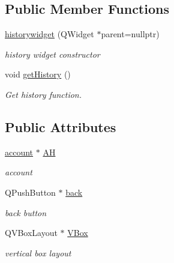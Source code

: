 \subsection*{Public Member Functions}
\begin{DoxyCompactItemize}
\item 
\hyperlink{classhistorywidget_ac21cb2c9cdecd91ac572d8fc8ba50708}{historywidget} (Q\+Widget $\ast$parent=nullptr)
\begin{DoxyCompactList}\small\item\em history widget constructor \end{DoxyCompactList}\item 
void \hyperlink{classhistorywidget_aa2edafd200341f9273bc3c8c4930902e}{get\+History} ()
\begin{DoxyCompactList}\small\item\em Get history function. \end{DoxyCompactList}\end{DoxyCompactItemize}
\subsection*{Public Attributes}
\begin{DoxyCompactItemize}
\item 
\mbox{\label{classhistorywidget_a9d630c4651725438d7161588bd084248}} 
\hyperlink{classaccount}{account} $\ast$ \hyperlink{classhistorywidget_a9d630c4651725438d7161588bd084248}{AH}
\begin{DoxyCompactList}\small\item\em account \end{DoxyCompactList}\item 
\mbox{\label{classhistorywidget_aa03cf30ef4ba1cf78f4e903d981d9783}} 
Q\+Push\+Button $\ast$ \hyperlink{classhistorywidget_aa03cf30ef4ba1cf78f4e903d981d9783}{back}
\begin{DoxyCompactList}\small\item\em back button \end{DoxyCompactList}\item 
\mbox{\label{classhistorywidget_a2f81897b41709e0218730acb285e60ea}} 
Q\+V\+Box\+Layout $\ast$ \hyperlink{classhistorywidget_a2f81897b41709e0218730acb285e60ea}{V\+Box}
\begin{DoxyCompactList}\small\item\em vertical box layout \end{DoxyCompactList}\end{DoxyCompactItemize}



